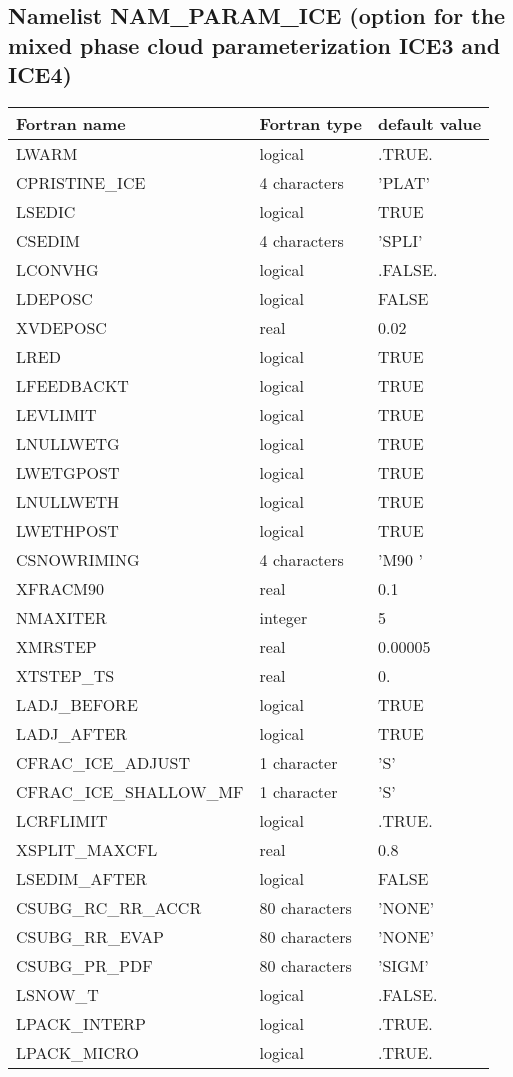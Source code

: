 \subsection{Namelist NAM\_PARAM\_ICE (option for the mixed phase cloud 
parameterization ICE3 and ICE4)}
%
\begin{longtable} {|p{}|p{}|p{}|}
\hline
Fortran name &  Fortran type & default value \\
\hline 
\endhead
\hline
\endfoot
LWARM         &  logical     & .TRUE. \\
CPRISTINE\_ICE & 4 characters & 'PLAT' \\
LSEDIC & logical & TRUE \\
CSEDIM & 4 characters & 'SPLI' \\
LCONVHG       &  logical     & .FALSE. \\
LDEPOSC& logical & FALSE \\
XVDEPOSC& real & 0.02 \\
LRED & logical & TRUE \\
LFEEDBACKT & logical & TRUE \\
LEVLIMIT & logical & TRUE \\
LNULLWETG & logical & TRUE \\
LWETGPOST & logical & TRUE \\
 LNULLWETH & logical & TRUE \\
LWETHPOST & logical & TRUE \\
CSNOWRIMING & 4 characters & 'M90 ' \\
XFRACM90 & real & 0.1 \\
NMAXITER & integer & 5 \\
XMRSTEP & real & 0.00005 \\
XTSTEP\_TS & real & 0. \\
LADJ\_BEFORE & logical & TRUE \\
LADJ\_AFTER & logical & TRUE \\
CFRAC\_ICE\_ADJUST  & 1 character & 'S' \\
CFRAC\_ICE\_SHALLOW\_MF& 1 character & 'S' \\
LCRFLIMIT &  logical     & .TRUE. \\
XSPLIT\_MAXCFL& real & 0.8 \\
LSEDIM\_AFTER & logical & FALSE \\
CSUBG\_RC\_RR\_ACCR & 80 characters & 'NONE' \\
CSUBG\_RR\_EVAP & 80 characters & 'NONE' \\
CSUBG\_PR\_PDF & 80 characters & 'SIGM' \\
LSNOW\_T & logical & .FALSE. \\
LPACK\_INTERP & logical & .TRUE. \\
LPACK\_MICRO & logical & .TRUE. \\
\end{longtable}

